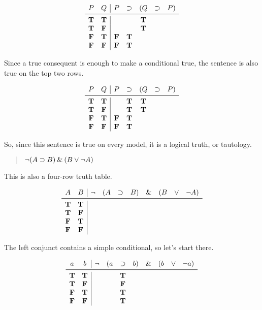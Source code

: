 \documentclass[../logic-text.tex]{subfiles}
\begin{document}
\[
\begin{array}{cc|ccccc}
  P & Q & P & \lif & (Q & \lif & P) \\ \midrule
  \true & \true &&& \true && \\
    \true & \false &&& \true && \\
  \false & \true & \false & \true &&& \\
  \false & \false & \false & \true &&& \\
\end{array}
\]

Since a true consequent is enough to make a conditional true, the sentence is also true on the top two rows.

\[
\begin{array}{cc|ccccc}
  P & Q & P & \lif & (Q & \lif & P) \\ \midrule
  \true & \true && \true & \true && \\
    \true & \false && \true & \true && \\
  \false & \true & \false & \true &&& \\
  \false & \false & \false & \true &&& \\
\end{array}
\]

So, since this sentence is true on every model, it is a logical truth, or tautology.


\begin{quote}
  \(\neg (A \supset B) \mathbin{\&} (B \lor \neg A)\)
\end{quote}


This is also a four-row truth table.


\[
  \begin{array}{cc|ccccccccc}
    A & B & \lneg & (A & \lif & B) & \land & (B & \lor & \lneg A) \\ \midrule
    \true & \true &&&&&&&& \\
    \true & \false &&&&&&&& \\
    \false & \true &&&&&&&& \\
    \false & \false &&&&&&&& \\
  \end{array}
\]

The left conjunct contains a simple conditional, so let's start there.

\[
  \begin{array}{cc|cccccccc}
    a & b & \lneg & (a & \lif & b) & \land & (b & \lor & \lneg a) \\ \midrule
    \true & \true &&& \true &&&&& \\
    \true & \false &&& \false &&&&& \\
    \false & \true &&& \true &&&&& \\
    \false & \false &&& \true &&&&& \\
  \end{array}
\]
\end{document}
